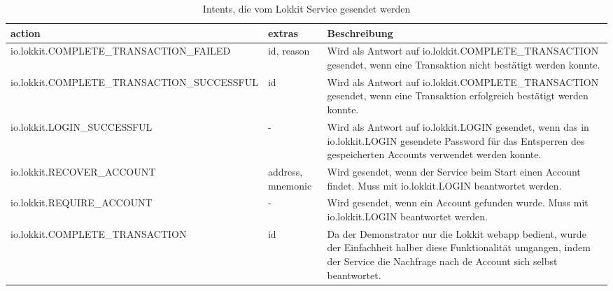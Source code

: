 \begin{table}[H]
\centering
\caption{Intents, die vom Lokkit Service gesendet werden}
\label{tbl:LokktService_SendIntents}
\begin{tabular}{@{}L{3cm}L{2cm}L{10cm}@{}}
\toprule
action & extras & Beschreibung \\ \midrule
io.lokkit.\newline{}COMPLETE\newline{}\_TRANSACTION\newline{}\_FAILED & id, reason & Wird als Antwort auf io.lokkit.COMPLETE\_TRANSACTION gesendet, wenn eine Transaktion nicht bestätigt werden konnte. \\\midrule
io.lokkit.\newline{}COMPLETE\newline{}\_TRANSACTION\newline{}\_SUCCESSFUL & id & Wird als Antwort auf io.lokkit.COMPLETE\_TRANSACTION gesendet, wenn eine Transaktion erfolgreich bestätigt werden konnte. \\\midrule
io.lokkit.\newline{}LOGIN\newline{}\_SUCCESSFUL & - & Wird als Antwort auf io.lokkit.LOGIN gesendet, wenn das in io.lokkit.LOGIN gesendete Password für das Entsperren des gespeicherten Accounts verwendet werden konnte. \\\midrule
io.lokkit.\newline{}RECOVER\newline{}\_ACCOUNT & address, mnemonic & Wird gesendet, wenn der Service beim Start einen Account findet. Muss mit io.lokkit.LOGIN beantwortet werden. \\\midrule
io.lokkit.\newline{}REQUIRE\newline{}\_ACCOUNT & - & Wird gesendet, wenn ein Account gefunden wurde. Muss mit io.lokkit.LOGIN beantwortet werden. \\\midrule
io.lokkit.\newline{}COMPLETE\newline{}\_TRANSACTION & id & Da der Demonstrator nur die Lokkit webapp bedient, wurde der Einfachheit halber diese Funktionalität umgangen, indem der Service die Nachfrage nach de Account sich selbst beantwortet. \\
\bottomrule
\end{tabular}
\end{table}

